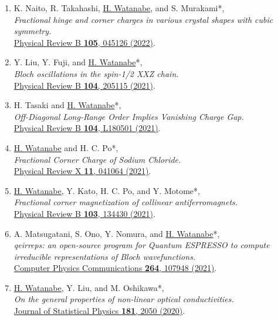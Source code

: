 \documentclass[letterpaper,11pt]{article}
\begin{document}
\begin{enumerate}
\item K. Naito, R. Takahashi, \underline{H. Watanabe}, and S. Murakami*, \\\emph{Fractional hinge and corner charges in various crystal shapes with cubic symmetry.}\\{\href{https://doi.org/10.1103/PhysRevB.105.045126}{Physical Review B {\bf 105}, 045126 (2022)}.}

\item Y. Liu, Y. Fuji, and \underline{H. Watanabe}*, \\\emph{Bloch oscillations in the spin-1/2 XXZ chain.}\\{\href{https://doi.org/10.1103/PhysRevB.104.205115}{Physical Review B {\bf 104}, 205115 (2021)}.}

\item H. Tasaki and \underline{H. Watanabe}*, \\\emph{Off-Diagonal Long-Range Order Implies Vanishing Charge Gap.}\\{\href{https://doi.org/10.1103/PhysRevB.104.L180501}{Physical Review B {\bf 104}, L180501 (2021)}.}

\item \underline{H. Watanabe} and H. C. Po*, \\\emph{Fractional Corner Charge of Sodium Chloride.}\\{\href{https://doi.org/10.1103/PhysRevX.11.041064}{Physical Review X {\bf 11}, 041064 (2021)}.}

\item  \underline{H. Watanabe}, Y. Kato, H. C. Po, and Y. Motome*, \\\emph{Fractional corner magnetization of collinear antiferromagnets.}\\{\href{https://doi.org/10.1103/PhysRevB.103.134430}{Physical Review B {\bf 103}, 134430 (2021)}.}

\item A. Matsugatani, S. Ono, Y. Nomura, and \underline{H. Watanabe}*, \\\emph{qeirreps: an open-source program for Quantum ESPRESSO to compute irreducible representations of Bloch wavefunctions.}\\{\href{https://doi.org/10.1016/j.cpc.2021.107948}{Computer Physics Communications {\bf 264}, 107948 (2021)}.}

\item \underline{H. Watanabe}, Y. Liu, and M. Oshikawa*, \\\emph{On the general properties of non-linear optical conductivities.}\\{\href{https://doi.org/10.1007/s10955-020-02654-5}{Journal of Statistical Physics {\bf 181}, 2050 (2020)}.}


\end{enumerate}
\end{document}
